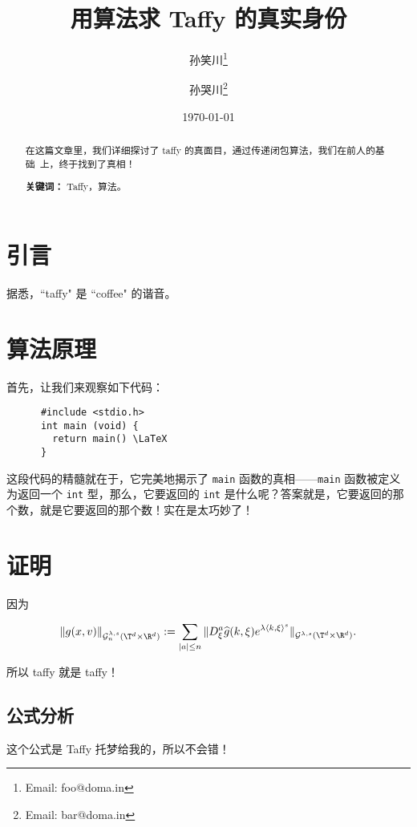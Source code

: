\documentclass{ctexart}
\title{用算法求 Taffy 的真实身份}
\author{孙笑川\thanks{Email: foo@doma.in} \and 孙哭川\thanks{Email: bar@doma.in}}
\date{\today}
\begin{document}
  
  \maketitle
  \begin{abstract}
    {在这篇文章里，我们详细探讨了 taffy 的真面目，通过传递闭包算法，我们在前人的基础~\cite{coffee}上，终于找到了真相！}
    \par\textbf{关键词：} Taffy，算法。  
  \end{abstract}


  \tableofcontents

  \section{引言}
    据悉，``taffy" 是 ``coffee" 的谐音。  %


  \section{算法原理}\label{code}  %
    首先，让我们来观察如下代码：

    \begin{verbatim}
      #include <stdio.h>
      int main (void) {
        return main() \LaTeX
      }
    \end{verbatim}
    这段代码的精髓就在于，它完美地揭示了 \verb|main| 函数的真相——\verb|main| 函数被定义为返回一个 \verb|int| 型，那么，它要返回的 \verb|int| 是什么呢？答案就是，它要返回的那个数，就是它要返回的那个数！实在是太巧妙了！


  \section{证明}
    因为 

    \[
      \|g(x,v)\|_{\mathcal{G}^{\lambda,s}_n(\T^d\times\R^d)}:=\sum_{|a|\leq n}     \|D^a_\xi\widehat{g}(k,\xi)e^{\lambda\langle k,\xi\rangle^s}\|_{\mathcal     {G}^{\lambda,s}(\T^d\times\R^d)}.
    \]
   
    所以 taffy 就是 taffy！
    \subsection{公式分析}  %
      这个公式是 Taffy 托梦给我的，所以不会错！
\end{document}
